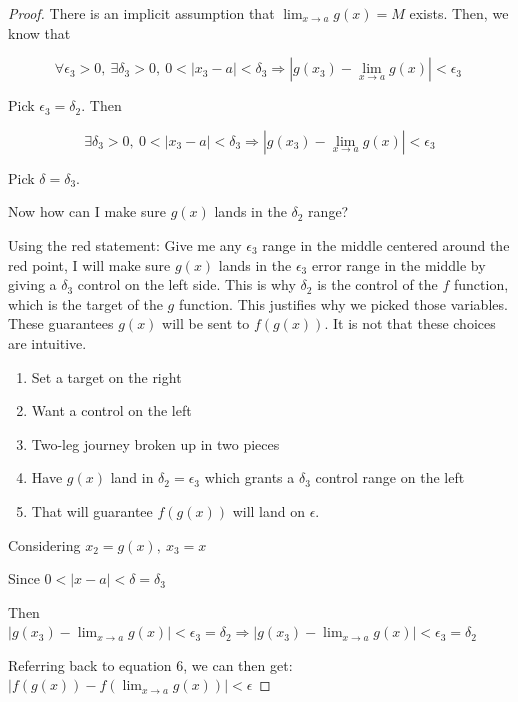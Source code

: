 \documentclass[12pt]{article}
\theoremstyle{plain}
\theoremstyle{remark}
\theoremstyle{definition}
\begin{document}
\begin{proof}
There is an implicit assumption that
\(\lim_{x \rightarrow a}{g(x)} = M\) exists. Then, we know that

\[\forall\epsilon_{3} > 0,\ \exists\delta_{3} > 0,\ 0 < \left| x_{3} - a \right| < \delta_{3} \Rightarrow \left| g\left( x_{3} \right) - \lim_{x \rightarrow a}{g(x)} \right| < \epsilon_{3}\  \]

Pick \(\epsilon_{3} = \delta_{2}\). Then

\[\exists\delta_{3} > 0,\ 0 < \left| x_{3} - a \right| < \delta_{3} \Rightarrow \left| g\left( x_{3} \right) - \lim_{x \rightarrow a}{g(x)} \right| < \epsilon_{3}\]

Pick \(\delta = \delta_{3}\).

Now how can I make sure \(g(x)\) lands in the \(\delta_{2}\) range?

Using the red statement: Give me any \(\epsilon_{3}\) range in the
middle centered around the red point, I will make sure \(g(x)\) lands in
the \(\epsilon_{3}\) error range in the middle by giving a
\(\delta_{3}\) control on the left side. This is why \(\delta_{2}\) is
the control of the \(f\) function, which is the target of the \(g\)
function. This justifies why we picked those variables. These guarantees
\(g(x)\) will be sent to \(f\left( g(x) \right)\). It is not that these
choices are intuitive.

\begin{enumerate}
\def\labelenumi{\arabic{enumi}.}
\item
  Set a target on the right
\item
  Want a control on the left
\item
  Two-leg journey broken up in two pieces
\item
  Have \(g(x)\) land in \(\delta_{2} = \epsilon_{3}\) which grants a
  \(\delta_{3}\) control range on the left
\item
  That will guarantee \(f\left( g(x) \right)\) will land on
  \(\epsilon\).
\end{enumerate}

Considering \(x_{2} = g(x),\ x_{3} = x\)

Since \(0 < |x - a| < \delta = \delta_{3}\)

Then
\(\left| g\left( x_{3} \right) - \lim_{x \rightarrow a}{g(x)} \right| < \epsilon_{3} = \delta_{2} \Rightarrow \left| g(x_{3}) - \lim_{x \rightarrow a}{g(x)} \right| < \epsilon_{3} = \delta_{2}\)

Referring back to equation 6, we can then get:
\(\left| f\left( g(x) \right) - f\left( \lim_{x \rightarrow a}{g(x)} \right) \right| < \epsilon\)



\end{proof}
\end{document}
